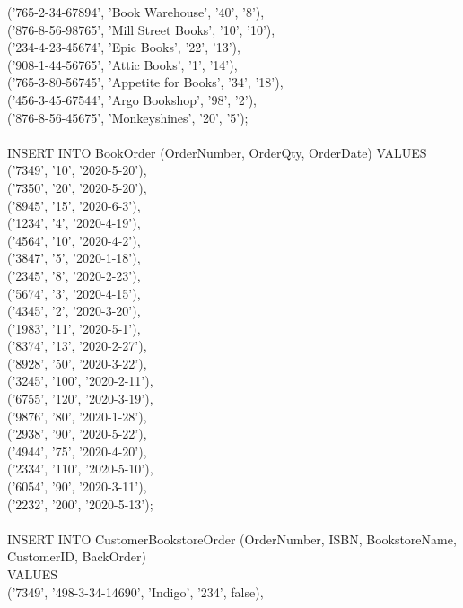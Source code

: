\documentclass{scrreprt}
\begin{document}
       ('765-2-34-67894', 'Book Warehouse', '40', '8'),\\
       ('876-8-56-98765', 'Mill Street Books', '10', '10'),\\
       ('234-4-23-45674', 'Epic Books', '22', '13'),\\
       ('908-1-44-56765', 'Attic Books', '1', '14'),\\
       ('765-3-80-56745', 'Appetite for Books', '34', '18'),\\
       ('456-3-45-67544', 'Argo Bookshop', '98', '2'),\\
       ('876-8-56-45675', 'Monkeyshines', '20', '5');\\\\
INSERT INTO BookOrder (OrderNumber, OrderQty, OrderDate)
VALUES \\('7349', '10', '2020-5-20'),\\
       ('7350', '20', '2020-5-20'),\\
       ('8945', '15', '2020-6-3'),\\
       ('1234', '4', '2020-4-19'),\\
       ('4564', '10', '2020-4-2'),\\
       ('3847', '5', '2020-1-18'),\\
       ('2345', '8', '2020-2-23'),\\
       ('5674', '3', '2020-4-15'),\\
       ('4345', '2', '2020-3-20'),\\
       ('1983', '11', '2020-5-1'),\\
       ('8374', '13', '2020-2-27'),\\
       ('8928', '50', '2020-3-22'),\\
       ('3245', '100', '2020-2-11'),\\
       ('6755', '120', '2020-3-19'),\\
       ('9876', '80', '2020-1-28'),\\
       ('2938', '90', '2020-5-22'),\\
       ('4944', '75', '2020-4-20'),\\
       ('2334', '110', '2020-5-10'),\\
       ('6054', '90', '2020-3-11'),\\
       ('2232', '200', '2020-5-13');\\\\
INSERT INTO CustomerBookstoreOrder (OrderNumber, ISBN, BookstoreName, CustomerID, BackOrder)\\
VALUES \\('7349', '498-3-34-14690', 'Indigo', '234', false),\\
\end{document}
